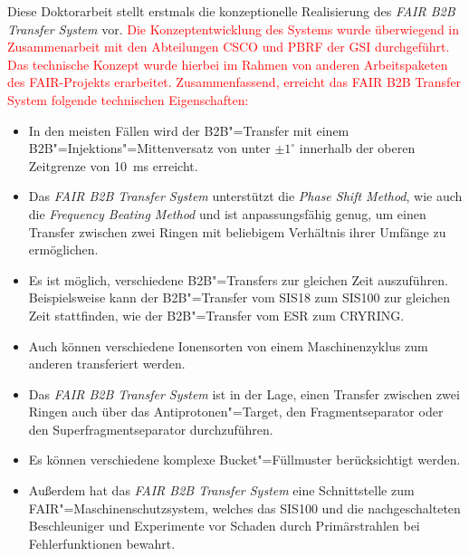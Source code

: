 Diese Doktorarbeit stellt erstmals die konzeptionelle Realisierung des \textit{FAIR B2B Transfer System} vor. \textcolor{red}{Die Konzeptentwicklung des Systems wurde überwiegend in Zusammenarbeit mit den Abteilungen CSCO und PBRF der GSI durchgeführt. Das technische Konzept wurde hierbei im Rahmen von anderen Arbeitspaketen des FAIR-Projekts erarbeitet. Zusammenfassend, erreicht das FAIR B2B Transfer System folgende technischen Eigenschaften:}
\begin{itemize}
\item In den meisten F\"allen wird der B2B"=Transfer mit einem B2B"=Injektions"=Mittenversatz von unter $\pm 1^\circ$ innerhalb der oberen Zeitgrenze von \SI{10}{\ms} erreicht. 
\item Das \textit{FAIR B2B Transfer System} unterst\"utzt die \textit{Phase Shift Method}, wie auch die \textit{Frequency Beating Method} und ist anpassungsf\"ahig genug, um einen Transfer zwischen zwei Ringen mit beliebigem Verh\"altnis ihrer Umf\"ange zu erm\"oglichen. 
\item Es ist m\"oglich, verschiedene B2B"=Transfers zur gleichen Zeit auszuf\"uhren. Beispielsweise kann der B2B"=Transfer vom SIS18 zum SIS100 zur gleichen Zeit stattfinden, wie der B2B"=Transfer vom ESR zum CRYRING. 
\item Auch k\"onnen verschiedene Ionensorten von einem Maschinenzyklus zum anderen transferiert werden. 
\item Das \textit{FAIR B2B Transfer System} ist in der Lage, einen Transfer zwischen zwei Ringen auch \"uber das Antiprotonen"=Target, den Fragmentseparator oder den Superfragmentseparator durchzuf\"uhren. 
\item Es k\"onnen verschiedene komplexe Bucket"=F\"ullmuster ber\"ucksichtigt werden. 
\item Au\ss{}erdem hat das \textit{FAIR B2B Transfer System} eine Schnittstelle zum FAIR"=Maschinenschutzsystem, welches das SIS100 und die nachgeschalteten Beschleuniger und Experimente vor Schaden durch Prim\"arstrahlen bei Fehlerfunktionen bewahrt. 
\end{itemize}


